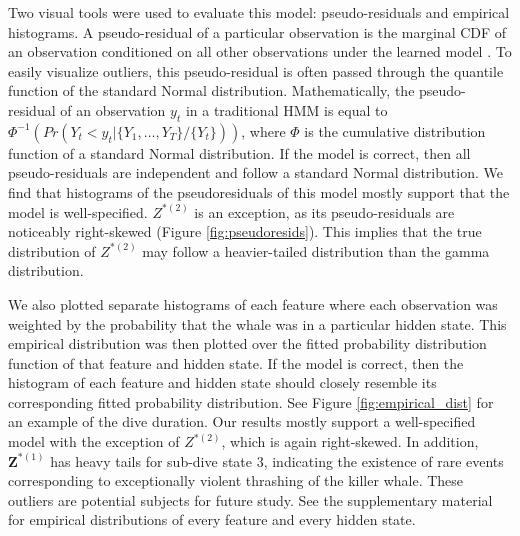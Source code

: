 Two visual tools were used to evaluate this model: pseudo-residuals and empirical histograms. A pseudo-residual of a particular observation is the marginal CDF of an observation conditioned on all other observations under the learned model \citep{Zucchini:2016}. To easily visualize outliers, this pseudo-residual is often passed through the quantile function of the standard Normal distribution. Mathematically, the pseudo-residual of an observation $y_t$ in a traditional HMM is equal to $\Phi^{-1} \left(Pr(Y_t < y_t|\{Y_1,\ldots,Y_T\}/\{Y_t\}) \right)$, where $\Phi$ is the cumulative distribution function of a standard Normal distribution. If the model is correct, then all pseudo-residuals are independent and follow a standard Normal distribution. We find that histograms of the pseudoresiduals of this model mostly support that the model is well-specified. $Z^{*(2)}$ is an exception, as its pseudo-residuals are noticeably right-skewed (Figure \ref{fig:pseudoresids}). This implies that the true distribution of $Z^{*(2)}$ may follow a heavier-tailed distribution than the gamma distribution. 

We also plotted separate histograms of each feature where each observation was weighted by the probability that the whale was in a particular hidden state. This empirical distribution was then plotted over the fitted probability distribution function of that feature and hidden state. If the model is correct, then the histogram of each feature and hidden state should closely resemble its corresponding fitted probability distribution. See Figure \ref{fig:empirical_dist} for an example of the dive duration. Our results mostly support a well-specified model with the exception of $Z^{*(2)}$, which is again right-skewed. In addition, $\mathbf{Z}^{*(1)}$ has heavy tails for sub-dive state 3, indicating the existence of rare events corresponding to exceptionally violent thrashing of the killer whale. These outliers are potential subjects for future study. See the supplementary material for empirical distributions of every feature and every hidden state. 